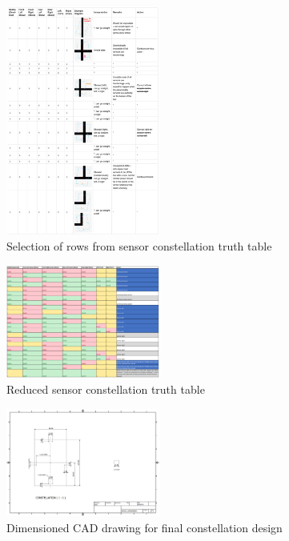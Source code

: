 \documentclass[conference]{IEEEtran}
\begin{document}
\begin{figure}[H]
	\centerline{\includegraphics[width=0.45\textwidth]{sensor-table.png}}
	\caption{Selection of rows from sensor constellation truth table}
	\label{fig:sensor-table}
\end{figure}
\begin{figure}[H]
	\centerline{\includegraphics[width=0.45\textwidth]{sensor-table-reduced.png}}
	\caption{Reduced sensor constellation truth table}
	\label{fig:sensor-table-reduced}
\end{figure}

\begin{figure}[H]
	\centerline{\includegraphics[width=0.45\textwidth]{constellation-cad.png}}
	\caption{Dimensioned CAD drawing for final constellation design}
	\label{fig:constellation-cad}
\end{figure}
\end{document}
